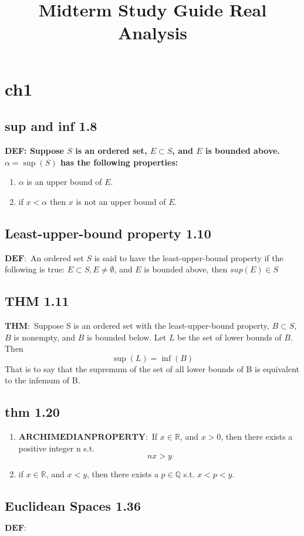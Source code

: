 \documentclass[12pt]{article}
\newcommand{\R}{\mathbb{R}}
\newcommand{\Q}{\mathbb{Q}}
\begin{document}
	\title{\vspace{-2.0cm}Midterm Study Guide Real Analysis}
	\maketitle
	
	\section{ch1}
	\subsection{sup and inf 1.8}
	\bf DEF: Suppose $ S $ is an ordered set, $ E \subset S $, and $ E $ is bounded above. $ \alpha = \sup (S) $ has the following properties:
	\begin{enumerate}[label=(i.),leftmargin=.5in]
		\item $ \alpha $ is an upper bound of $ E $.
		\item if $ x < \alpha $ then $ x $ is not an upper bound of $ E $.
	\end{enumerate}
	\subsection{Least-upper-bound property 1.10}
	$ \mathbf{ DEF:} $ An ordered set $ S $ is said to have the least-upper-bound property if the following is true:
	$ E\subset S, E\neq\emptyset $, and $ E$ is bounded above, then $ sup (E )\in S $
	\subsection{THM 1.11}
	$ \mathbf{ THM:} $ Suppose S is an ordered set with the least-upper-bound property, $ B\subset S$, $ B $ is nonempty, and $ B $ is bounded below. Let $ L $ be the set of lower bounds of $ B $. Then 
	\[
	\sup(L) = \inf(B)
	\]
	That is to say that the supremum of the set of all lower bounds of B is equivalent to the infemum of B. 
	\subsection{thm 1.20}
	\begin{enumerate}[leftmargin=.5in]
		\item $ \mathbf {ARCHIMEDIAN PROPERTY:} $ If $ x\in\R $, and $ x>0 $, then there exists a positive integer n s.t.
		\[
		nx>y
		\]
		
		\item if $ x\in\R$, and $ x<y $, then there exists a $ p\in\Q $ s.t. $ x<p<y $.
	\end{enumerate}
	\subsection{Euclidean Spaces 1.36}
	$ \mathbf{ DEF:} $ 
\end{document}
